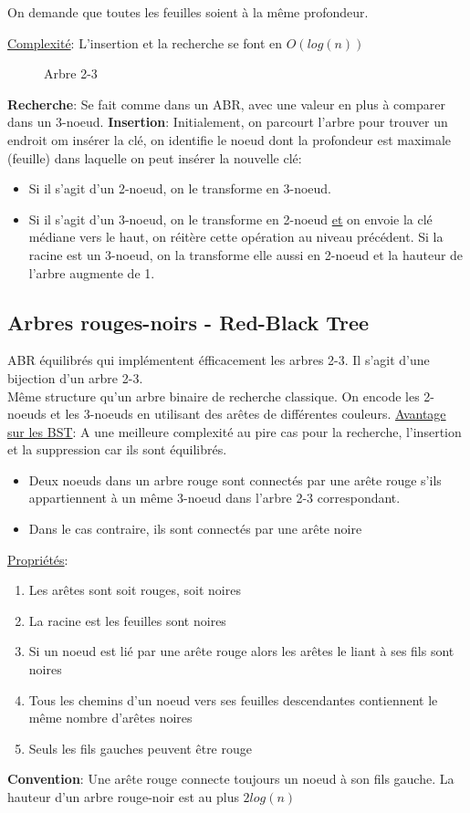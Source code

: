 \documentclass[10pt]{article}
\begin{document}
On demande que toutes les feuilles soient à la même profondeur.

\underline{Complexité}: L'insertion et la recherche se font en $O(log(n))$

\begin{figure}[H]
\caption{Arbre 2-3}
\label{fig:23tree}
\end{figure}

\textbf{Recherche}: Se fait comme dans un ABR, avec une valeur en plus à comparer dans un 3-noeud.
\textbf{Insertion}: Initialement, on parcourt l'arbre pour trouver un endroit om insérer la clé, on identifie le noeud dont la profondeur est maximale (feuille) dans laquelle on peut insérer la nouvelle clé:
\begin{itemize}
\item Si il s'agit d'un 2-noeud, on le transforme en 3-noeud.
\item Si il s'agit d'un 3-noeud, on le transforme en 2-noeud \underline{et} on envoie la clé médiane vers le haut, on réitère cette opération au niveau précédent. Si la racine est un 3-noeud, on la transforme elle aussi en 2-noeud et la hauteur de l'arbre augmente de 1.
\end{itemize}

\subsection{Arbres rouges-noirs - Red-Black Tree}
ABR équilibrés qui implémentent éfficacement les arbres 2-3.
Il s'agit d'une bijection d'un arbre 2-3.
\\
Même structure qu'un arbre binaire de recherche classique. On encode les 2-noeuds et les 3-noeuds en utilisant des arêtes de différentes couleurs.
\underline{Avantage sur les BST}: A une meilleure complexité au pire cas pour la recherche, l'insertion et la suppression car ils sont équilibrés.
\begin{itemize}
\item Deux noeuds dans un arbre rouge sont connectés par une arête rouge s'ils appartiennent à un même 3-noeud dans l'arbre 2-3 correspondant.
\item Dans le cas contraire, ils sont connectés par une arête noire
\end{itemize}
\underline{Propriétés}: 
\begin{enumerate}
\item Les arêtes sont soit rouges, soit noires
\item La racine est les feuilles sont noires
\item Si un noeud est lié par une arête rouge alors les arêtes le liant à ses fils sont noires
\item Tous les chemins d'un noeud vers ses feuilles descendantes contiennent le même nombre d'arêtes noires
\item Seuls les fils gauches peuvent être rouge
\end{enumerate}
\textbf{Convention}: Une arête rouge connecte toujours un noeud à son fils gauche.
La hauteur d'un arbre rouge-noir est au plus $2log(n)$ 
\end{document}
